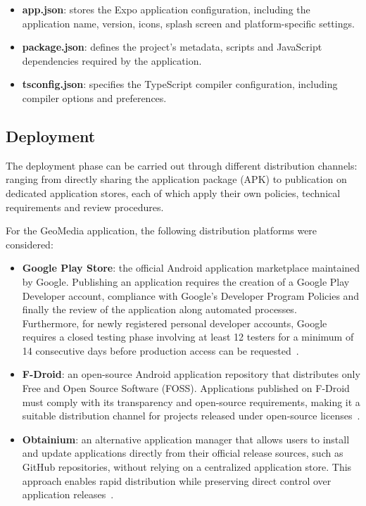 \begin{itemize}
    \item \textbf{app.json}: stores the Expo application configuration, including the application name, version, icons, splash screen and platform-specific settings.
    \item \textbf{package.json}: defines the project's metadata, scripts and JavaScript dependencies required by the application.
    \item \textbf{tsconfig.json}: specifies the TypeScript compiler configuration, including compiler options and preferences.
\end{itemize}


\subsection{Deployment}
\label{sub:deployment}

The deployment phase can be carried out through different distribution channels: ranging from directly sharing the application package (APK) to publication on dedicated application stores, each of which apply their own policies, technical requirements and review procedures. 

For the GeoMedia application, the following distribution platforms were considered:

\begin{itemize}
    \item \textbf{Google Play Store}: the official Android application marketplace maintained by Google. Publishing an application requires the creation of a Google Play Developer account, compliance with Google's Developer Program Policies and finally the review of the application along automated processes. \\
    Furthermore, for newly registered personal developer accounts, Google requires a closed testing phase involving at least 12 testers for a minimum of 14 consecutive days before production access can be requested~\cite{site:google-play-publishing}.

    \item \textbf{F-Droid}: an open-source Android application repository that distributes only Free and Open Source Software (FOSS). Applications published on F-Droid must comply with its transparency and open-source requirements, making it a suitable distribution channel for projects released under open-source licenses~\cite{site:fdroid-inclusion-policy}.

    \item \textbf{Obtainium}: an alternative application manager that allows users to install and update applications directly from their official release sources, such as GitHub repositories, without relying on a centralized application store. This approach enables rapid distribution while preserving direct control over application releases~\cite{site:obtainium-sources}.

\end{itemize}


